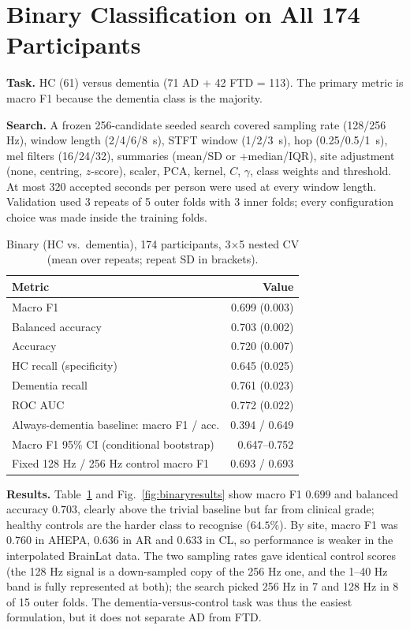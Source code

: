 \documentclass[10pt,twocolumn,a4paper]{article}
\begin{document}
\section{Binary Classification on All 174 Participants}
\label{sec:binary}
\textbf{Task.} HC (61) versus dementia (71 AD + 42 FTD = 113). The primary metric is macro F1 because the dementia class is the majority.

\textbf{Search.} A frozen 256-candidate seeded search covered sampling rate (128/256 Hz), window length (2/4/6/8~s), STFT window (1/2/3~s), hop (0.25/0.5/1~s), mel filters (16/24/32), summaries (mean/SD or +median/IQR), site adjustment (none, centring, $z$-score), scaler, PCA, kernel, $C$, $\gamma$, class weights and threshold. At most 320 accepted seconds per person were used at every window length. Validation used 3 repeats of 5 outer folds with 3 inner folds; every configuration choice was made inside the training folds.

\begin{table}[t]
\centering\small
\caption{Binary (HC vs.\ dementia), 174 participants, 3$\times$5 nested CV (mean over repeats; repeat SD in brackets).}
\label{tab:binary}
\begin{tabular}{@{}lr@{}}
\toprule
Metric & Value\\
\midrule
Macro F1 & 0.699 (0.003)\\
Balanced accuracy & 0.703 (0.002)\\
Accuracy & 0.720 (0.007)\\
HC recall (specificity) & 0.645 (0.025)\\
Dementia recall & 0.761 (0.023)\\
ROC AUC & 0.772 (0.022)\\
\midrule
Always-dementia baseline: macro F1 / acc. & 0.394 / 0.649\\
Macro F1 95\% CI (conditional bootstrap) & 0.647--0.752\\
Fixed 128 Hz / 256 Hz control macro F1 & 0.693 / 0.693\\
\bottomrule
\end{tabular}
\end{table}

\textbf{Results.} Table~\ref{tab:binary} and Fig.~\ref{fig:binaryresults} show macro F1 $0.699$ and balanced accuracy $0.703$, clearly above the trivial baseline but far from clinical grade; healthy controls are the harder class to recognise ($64.5\%$). By site, macro F1 was $0.760$ in AHEPA, $0.636$ in AR and $0.633$ in CL, so performance is weaker in the interpolated BrainLat data. The two sampling rates gave identical control scores (the 128 Hz signal is a down-sampled copy of the 256 Hz one, and the 1--40 Hz band is fully represented at both); the search picked 256 Hz in 7 and 128 Hz in 8 of 15 outer folds. The dementia-versus-control task was thus the easiest formulation, but it does not separate AD from FTD.
\end{document}
